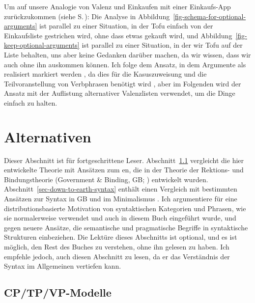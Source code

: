 Um auf unsere Analogie von Valenz und Einkaufen mit einer Einkaufs-App zurückzukommen (siehe S.\,\pageref{page-shopping-analogy}): Die
Analyse in Abbildung~\ref{fig-schema-for-optional-arguments} ist parallel zu einer Situation, in der Tofu
einfach von der Einkaufsliste gestrichen wird, ohne dass etwas gekauft wird, und Abbildung~\ref{fig-keep-optional-arguments} ist parallel zu einer
Situation, in der wir Tofu auf der Liste behalten, uns aber keine Gedanken darüber machen, da wir wissen, dass wir auch ohne ihn
auskommen können. Ich folge dem Ansatz, in dem Argumente als realisiert markiert werden \parencites[465]{MG2010a}[Abschnitt~16.4]{MuellerLehrbuch4}, da dies
für die Kasuszuweisung und die Teilvoranstellung von Verbphrasen benötigt wird \citep{Meurers99b}, aber im Folgenden wird der
Ansatz mit der Auflistung alternativer Valenzlisten verwendet, um die Dinge einfach zu halten.

\section{Alternativen}

Dieser Abschnitt ist für fortgeschrittene Leser. Abschnitt~\ref{sec-cp-tp-vp} vergleicht die hier entwickelte Theorie mit Ansätzen zum
en, die in der Theorie der Rektions- und Bindungstheorie (Government \& Binding, GB; \citealt{Chomsky81a,Chomsky86b}) entwickelt wurden. Abschnitt~\ref{sec-down-to-earth-syntax} enthält einen Vergleich mit
bestimmten Ansätzen zur Syntax in GB und im Minimalismus \citep{Chomsky95a-u}. Ich argumentiere für
eine distributionsbasierte Motivation von syntaktischen Kategorien und Phrasen, wie sie
normalerweise verwendet und auch in diesem Buch eingeführt wurde, und gegen neuere Ansätze, die
semantische und pragmatische Begriffe in syntaktische Strukturen einbeziehen. Die Lektüre dieses Abschnitts ist optional, und es ist
möglich, den Rest des Buches zu verstehen, ohne ihn gelesen zu haben. Ich empfehle jedoch, auch
diesen Abschnitt zu lesen, da er das Verständnis der Syntax im Allgemeinen vertiefen kann.

\subsection{CP/TP/VP-Modelle}
\label{sec-cp-tp-vp}\label{sec-cp-tp-vp-scrambling}
\label{sec-discussion-scope}

